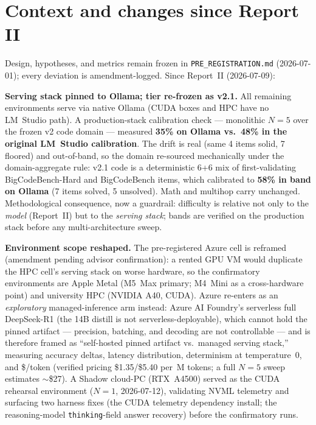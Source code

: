 \documentclass[sigconf,nonacm]{acmart}
\begin{document}
\maketitle

\section{Context and changes since Report II}
Design, hypotheses, and metrics remain frozen in \texttt{PRE\_REGISTRATION.md}
(2026-07-01); every deviation is amendment-logged. Since Report~II (2026-07-09):

\textbf{Serving stack pinned to Ollama; tier re-frozen as v2.1.} All remaining
environments serve via native Ollama (CUDA boxes and HPC have no LM~Studio path). A
production-stack calibration check --- monolithic $N{=}5$ over the frozen v2 code
domain --- measured \textbf{35\% on Ollama vs.\ 48\% in the original LM~Studio
calibration}. The drift is real (same 4 items solid, 7 floored) and out-of-band, so the
domain re-sourced mechanically under the domain-aggregate rule: v2.1 code is a
deterministic 6+6 mix of first-validating BigCodeBench-Hard and BigCodeBench items,
which calibrated to \textbf{58\% in band on Ollama} (7 items solved, 5 unsolved).
Math and multihop carry unchanged. Methodological consequence, now a guardrail:
difficulty is relative not only to the \emph{model} (Report~II) but to the
\emph{serving stack}; bands are verified on the production stack before any
multi-architecture sweep.

\textbf{Environment scope reshaped.} The pre-registered Azure cell is reframed
(amendment pending advisor confirmation): a rented GPU VM would duplicate the HPC
cell's serving stack on worse hardware, so the confirmatory environments are Apple
Metal (M5~Max primary; M4~Mini as a cross-hardware point) and university HPC (NVIDIA
A40, CUDA). Azure re-enters as an \emph{exploratory} managed-inference arm instead:
Azure AI Foundry's serverless full DeepSeek-R1 (the 14B distill is not
serverless-deployable), which cannot hold the pinned artifact --- precision, batching,
and decoding are not controllable --- and is therefore framed as ``self-hosted pinned
artifact vs.\ managed serving stack,'' measuring accuracy deltas, latency
distribution, determinism at temperature~0, and \$/token (verified pricing
\$1.35/\$5.40 per~M tokens; a full $N{=}5$ sweep estimates $\sim$\$27). A Shadow
cloud-PC (RTX~A4500) served as the CUDA rehearsal environment ($N{=}1$, 2026-07-12),
validating NVML telemetry and surfacing two harness fixes (the CUDA telemetry
dependency install; the reasoning-model \texttt{thinking}-field answer recovery)
before the confirmatory runs.
\end{document}
